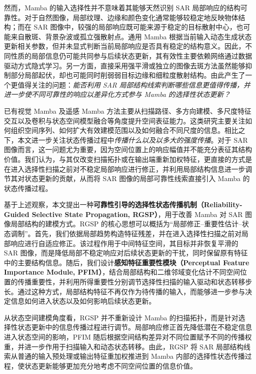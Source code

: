\documentclass[UTF8,12pt,a4paper]{ctexart}
\begin{document}
然而，Mamba 的输入选择性并不意味着其能够天然识别 SAR 局部响应的结构可靠性。对于自然图像，局部纹理、边缘和颜色变化通常能够较稳定地反映物体结构；而在 SAR 图像中，较强的局部响应既可能来源于稳定的目标散射中心，也可能来自散斑、背景杂波或孤立强散射点。通用 Mamba 根据当前输入动态生成状态更新相关参数，但并未显式判断当前局部响应是否具有稳定的结构意义。因此，不同性质的局部信息仍可能共同参与后续状态更新，其有效性主要依赖网络通过数据驱动方式隐式学习。另一方面，直接采用强平滑或独立的图像去斑方法虽然能够抑制部分局部起伏，却也可能同时削弱弱目标边缘和细粒度散射结构。由此产生了一个更值得关注的问题：\emph{能否利用 SAR 局部结构线索判断哪些信息更值得传播，并进一步使不同可靠性的响应以差异化方式参与 Mamba 的选择性状态更新？}

已有视觉 Mamba 及遥感 Mamba 方法主要从扫描路径、多方向建模、多尺度特征交互以及卷积与状态空间模型融合等角度提升空间表征能力\cite{rs_mamba,rstmtmamba,mambayolo,madinet}。这类研究主要关注如何组织空间序列、如何扩大有效建模范围以及如何融合不同尺度的信息。相比之下，本文进一步关注状态传播过程中\emph{传播什么以及以多大的强度传播}。对于 SAR 图像而言，这一问题尤为重要，因为空间位置上的响应幅值并不能充分表征其结构价值。我们认为，与其仅改变扫描拓扑或在输出端重新加权特征，更直接的方式是在进入选择性扫描之前对不稳定局部响应进行修正，并利用局部结构信息进一步调节其对状态更新的贡献，从而将 SAR 图像的局部可靠性线索直接引入 Mamba 的状态传播过程。

基于上述观察，本文提出一种\textbf{可靠性引导的选择性状态传播机制（Reliability-Guided Selective State Propagation, RGSP）}，用于改善 Mamba 对 SAR 图像局部结构的建模方式。RGSP 的核心思想可以概括为“局部修正--重要性估计--状态调制”。首先，我们依据局部趋势构造特征残差，并在进入选择性扫描之前对局部响应进行自适应修正。该过程作用于中间特征空间，其目标并非恢复平滑的 SAR 图像，而是降低局部不稳定响应对后续状态更新的干扰，同时保留原有特征中的主要结构信息。随后，我们设计\textbf{感知特征重要性模块（Perceptual Feature Importance Module, PFIM）}，结合局部结构和二维邻域变化估计不同空间位置的传播重要性，并利用所得重要性分别调节选择性扫描的输入驱动和状态转移步长。通过这种方式，局部结构特征不再仅作为待传播的输入，而能够进一步参与决定信息如何进入状态以及如何影响后续状态更新。

从状态空间建模角度看，RGSP 并不重新设计 Mamba 的扫描拓扑，而是针对选择性状态更新中的信息传播过程进行调节。局部响应修正首先降低潜在不稳定信息进入状态空间的影响，PFIM 随后根据空间结构差异对不同位置赋予不同的传播权重，并进一步作用于扫描输入和动态状态转移。由此，RGSP 将 SAR 局部结构线索从普通的输入预处理或输出特征重加权推进到 Mamba 内部的选择性状态传播过程，使状态更新能够更加充分地考虑不同空间位置的信息价值。
\end{document}
